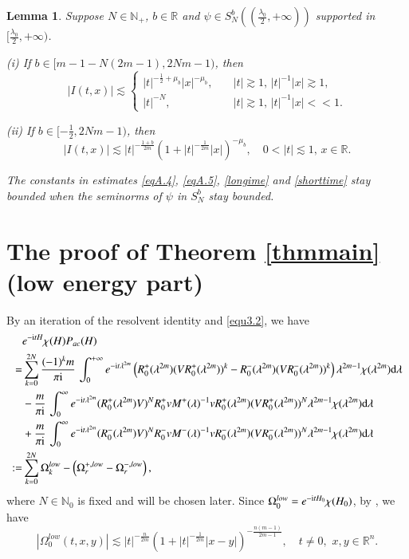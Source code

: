 \documentclass[11pt,reqno]{amsart}
\def\d{{\rm d}}
\def\i{{\rm i}}
\newtheorem{lemma}[theorem]{Lemma}
\numberwithin{equation}{section}
\theoremstyle{definition}
\begin{document}
\begin{lemma}\label{lemmaA.222}
	Suppose $N\in\mathbb{N}_+$, $b\in\mathbb{R}$ and $\psi\in S_N^b((\frac{\lambda_{0}}{2},+\infty))$ supported in $[\frac{\lambda_0}{2},+\infty)$.	
	
	\noindent (i) If $b\in[m-1-N(2m-1),2Nm-1)$, then
	\begin{equation}\label{longime}
		|I(t,x)|\lesssim\begin{cases}
			|t|^{-\frac 12+\mu_{b}}|x|^{-\mu_{b}},\quad&|t|\gtrsim1,\,|t|^{-1}|x|\gtrsim1,\\
			|t|^{-N},&|t|\gtrsim1,\,|t|^{-1}|x|<<1.
		\end{cases}
	\end{equation}
	
	\noindent (ii) If $b\in[-\frac 12,2Nm-1)$, then
	\begin{equation}\label{shorttime}
		|I(t,x)|\lesssim|t|^{-\frac{1+b}{2m}}\left(1+|t|^{-\frac{1}{2m}}|x|\right)^{-\mu_{b}},\quad0<|t|\lesssim1,\,x\in\mathbb{R}.
	\end{equation}
	
	The constants in estimates \eqref{eqA.4}, \eqref{eqA.5}, \eqref{longime} and \eqref{shorttime} stay bounded when the seminorms of $\psi$ in $S_N^b$ stay bounded.
\end{lemma}


\section{The proof of Theorem \ref{thmmain} (low energy part)}\label{section3}
By an iteration  of the resolvent identity and \eqref{equ3.2}, we have
\begin{align}\label{eq4.54}\small
	&e^{-\i tH}\chi( H)P_{ac}(H)\nonumber\\
	=&
	\sum_{k=0}^{2N}\frac{(-1)^{k}m}{\pi \i}\, \int_{0}^{+\infty}e^{-\i t\lambda^{2m}}\left(R_{0}^{+}(\lambda^{2m})(VR_{0}^{+}(\lambda^{2m}))^{k}-R_{0}^{-}(\lambda^{2m})(VR_{0}^{-}(\lambda^{2m}))^{k}\right)\lambda^{2m-1}\chi(\lambda^{2m})\d\lambda\nonumber\\
	&-\frac{m}{\pi \i}\, \int_{0}^{\infty}e^{-\i t\lambda^{2m}}(R_{0}^{+}(\lambda^{2m})V)^{N}R_{0}^{+}vM^{+}(\lambda)^{-1}vR_{0}^{+}(\lambda^{2m})(VR_{0}^{+}(\lambda^{2m}))^{N}\lambda^{2m-1}\chi(\lambda^{2m})\d\lambda\nonumber\\	
	&+\frac{m}{\pi \i}\, \int_{0}^{\infty}e^{-\i t\lambda^{2m}}(R_{0}^{-}(\lambda^{2m})V)^{N}R_{0}^{-}vM^{-}(\lambda)^{-1}vR_{0}^{-}(\lambda^{2m})(VR_{0}^{-}(\lambda^{2m}))^{N}\lambda^{2m-1}\chi(\lambda^{2m})\d\lambda\nonumber\\
	:=& \sum_{k=0}^{2N}\Omega^{low}_{k}-\left(\Omega^{+, low}_{ r}-\Omega^{-, low}_{r}\right),
\end{align}
where $N\in \mathbb{N}_0$ is fixed and will be chosen later.
Since
$\Omega^{low}_{0}=e^{-\i tH_0}\chi(H_0)$,
by \cite{Mi,HHZ}, we have
\begin{equation} \label{eq4.1.1}
	\left|\Omega^{ low}_{0}(t, x, y)\right|\lesssim |t|^{-\frac{n}{2 m}} \left(1+|t|^{-\frac{1}{2 m}}|x-y|\right)^{-\frac{n(m-1)}{2 m-1}},\quad t\neq0,\,\,x,y\in\mathbb{R}^n.
\end{equation}
\end{document}
